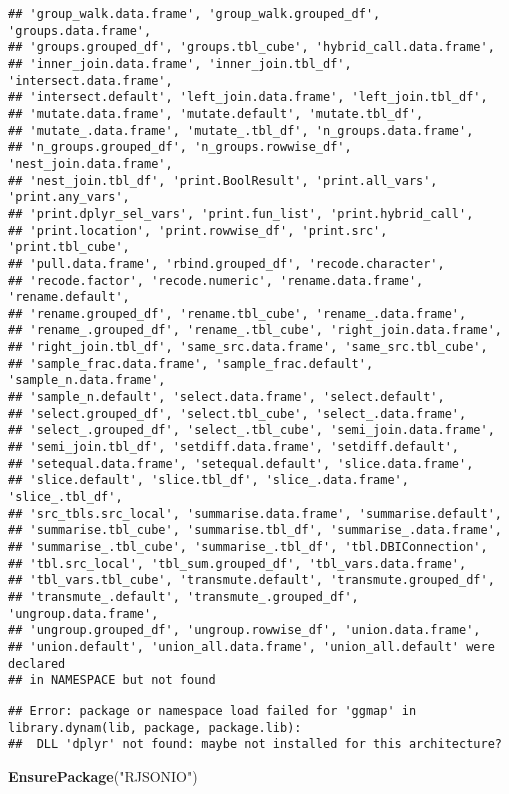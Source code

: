 \documentclass[]{article}
\newenvironment{Shaded}{\begin{snugshade}}{\end{snugshade}}
\newcommand{\KeywordTok}[1]{\textcolor[rgb]{0.13,0.29,0.53}{\textbf{#1}}}
\newcommand{\StringTok}[1]{\textcolor[rgb]{0.31,0.60,0.02}{#1}}
\newcommand{\NormalTok}[1]{#1}
\begin{document}
\begin{verbatim}
## 'group_walk.data.frame', 'group_walk.grouped_df', 'groups.data.frame',
## 'groups.grouped_df', 'groups.tbl_cube', 'hybrid_call.data.frame',
## 'inner_join.data.frame', 'inner_join.tbl_df', 'intersect.data.frame',
## 'intersect.default', 'left_join.data.frame', 'left_join.tbl_df',
## 'mutate.data.frame', 'mutate.default', 'mutate.tbl_df',
## 'mutate_.data.frame', 'mutate_.tbl_df', 'n_groups.data.frame',
## 'n_groups.grouped_df', 'n_groups.rowwise_df', 'nest_join.data.frame',
## 'nest_join.tbl_df', 'print.BoolResult', 'print.all_vars', 'print.any_vars',
## 'print.dplyr_sel_vars', 'print.fun_list', 'print.hybrid_call',
## 'print.location', 'print.rowwise_df', 'print.src', 'print.tbl_cube',
## 'pull.data.frame', 'rbind.grouped_df', 'recode.character',
## 'recode.factor', 'recode.numeric', 'rename.data.frame', 'rename.default',
## 'rename.grouped_df', 'rename.tbl_cube', 'rename_.data.frame',
## 'rename_.grouped_df', 'rename_.tbl_cube', 'right_join.data.frame',
## 'right_join.tbl_df', 'same_src.data.frame', 'same_src.tbl_cube',
## 'sample_frac.data.frame', 'sample_frac.default', 'sample_n.data.frame',
## 'sample_n.default', 'select.data.frame', 'select.default',
## 'select.grouped_df', 'select.tbl_cube', 'select_.data.frame',
## 'select_.grouped_df', 'select_.tbl_cube', 'semi_join.data.frame',
## 'semi_join.tbl_df', 'setdiff.data.frame', 'setdiff.default',
## 'setequal.data.frame', 'setequal.default', 'slice.data.frame',
## 'slice.default', 'slice.tbl_df', 'slice_.data.frame', 'slice_.tbl_df',
## 'src_tbls.src_local', 'summarise.data.frame', 'summarise.default',
## 'summarise.tbl_cube', 'summarise.tbl_df', 'summarise_.data.frame',
## 'summarise_.tbl_cube', 'summarise_.tbl_df', 'tbl.DBIConnection',
## 'tbl.src_local', 'tbl_sum.grouped_df', 'tbl_vars.data.frame',
## 'tbl_vars.tbl_cube', 'transmute.default', 'transmute.grouped_df',
## 'transmute_.default', 'transmute_.grouped_df', 'ungroup.data.frame',
## 'ungroup.grouped_df', 'ungroup.rowwise_df', 'union.data.frame',
## 'union.default', 'union_all.data.frame', 'union_all.default' were declared
## in NAMESPACE but not found
\end{verbatim}

\begin{verbatim}
## Error: package or namespace load failed for 'ggmap' in library.dynam(lib, package, package.lib):
##  DLL 'dplyr' not found: maybe not installed for this architecture?
\end{verbatim}

\begin{Shaded}
\begin{Highlighting}[]
\KeywordTok{EnsurePackage}\NormalTok{(}\StringTok{"RJSONIO"}\NormalTok{)}
\end{Highlighting}
\end{Shaded}
\end{document}
